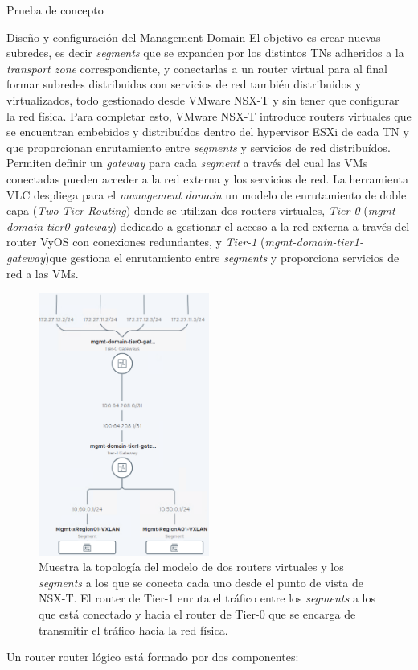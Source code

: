 \begin{section}{Prueba de concepto}
\begin{subsection}{Diseño y configuración del Management Domain}
    El objetivo es crear nuevas subredes, es decir \textit{segments} que se expanden por los distintos TNs adheridos a la \textit{transport zone} correspondiente, y conectarlas a un router virtual para al final formar subredes distribuidas con servicios de red también	distribuidos y virtualizados, todo gestionado desde VMware NSX-T y sin tener que configurar la red física. Para completar esto, VMware NSX-T introduce routers virtuales que se encuentran embebidos y distribuídos dentro del hypervisor ESXi de cada TN y que proporcionan enrutamiento entre \textit{segments} y servicios de red distribuídos. Permiten definir un \textit{gateway} para cada \textit{segment} a través del cual las VMs conectadas pueden acceder a la red externa y los servicios de red. La herramienta VLC despliega para el \textit{management domain} un modelo de enrutamiento de doble capa (\textit{Two Tier Routing}) donde se utilizan dos routers virtuales, \textit{Tier-0} (\textit{mgmt-domain-tier0-gateway}) dedicado a gestionar el acceso a la red externa a través del router VyOS con conexiones redundantes, y \textit{Tier-1} (\textit{mgmt-domain-tier1-gateway})que gestiona el enrutamiento entre \textit{segments} y proporciona servicios de red a las VMs.

    \begin{figure}[h]
      \centering
      \includegraphics[width=0.5\textwidth]{imaxes/pruebaconcepto/topologiaTwoTierRouting.png}
      \caption{Muestra la topología del modelo de dos routers virtuales y los \textit{segments} a los que se conecta cada uno desde el punto de vista de NSX-T. El router de Tier-1 enruta el tráfico entre los \textit{segments} a los que está conectado y hacia el router de Tier-0 que se encarga de transmitir el tráfico hacia la red física.}
      \label{fig:Topology-TwoTier-Routing-NSXT}
    \end{figure}
    \FloatBarrier
    Un router router lógico está formado por dos componentes:
    \begin{itemize}
      

\end{itemize}
\end{subsection}
\end{section}

